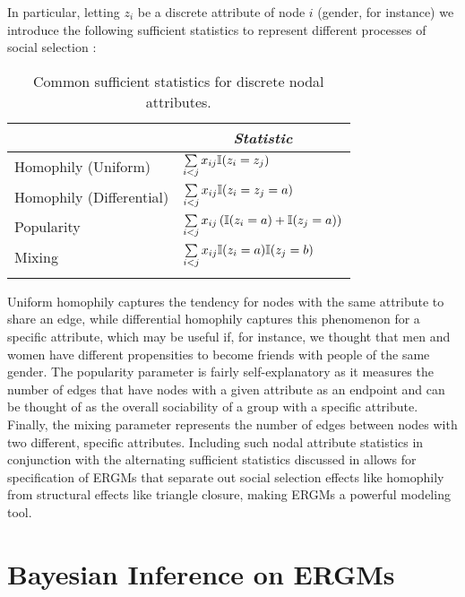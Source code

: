 In particular, letting $z_i$ be a discrete attribute of node $i$ (gender, for instance) we introduce the following sufficient statistics to represent different processes of social selection \cite{LKR12}:

\begin{table}[H]
	\caption{Common sufficient statistics for discrete nodal attributes.}
	\label{table:node_suff_stats_defn}
	\begin{center}
	\begin{tabular}[!h]{ll}
	\hhline{=|=}
	\multicolumn{1}{c}{\emph{Parameter}} &  \multicolumn{1}{c}{\emph{Statistic}}  \\ \midrule
	Homophily (Uniform)  & $\sum\limits_{i < j} x_{ij} \mathbb{I} (z_i = z_j) $ \\\midrule
	Homophily (Differential)  & $\sum\limits_{i < j} x_{ij} \mathbb{I} (z_i = z_j = a) $ \\\midrule
	Popularity &  $\sum\limits_{i < j} x_{ij} \left(\mathbb{I} (z_i = a) + \mathbb{I} (z_j = a) \right) $ \\ \midrule
	Mixing & $\sum\limits_{i < j} x_{ij} \mathbb{I} (z_i = a) \mathbb{I} (z_j = b)$  \\
	\hhline{=|=}
	\end{tabular}
	\end{center}
\end{table}

Uniform homophily captures the tendency for nodes with the same attribute to share an edge, while differential homophily captures this phenomenon for a specific attribute, which may be useful if, for instance, we thought that men and women have different propensities to become friends with people of the same gender. The popularity parameter is fairly self-explanatory as it measures the number of edges that have nodes with a given attribute as an endpoint and can be thought of as the overall sociability of a group with a specific attribute. Finally, the mixing parameter represents the number of edges between nodes with two different, specific attributes. Including such nodal attribute statistics in conjunction with the alternating sufficient statistics discussed in  allows for specification of ERGMs that separate out social selection effects like homophily from structural effects like triangle closure, making ERGMs a powerful modeling tool.

\section{Bayesian Inference on ERGMs}

